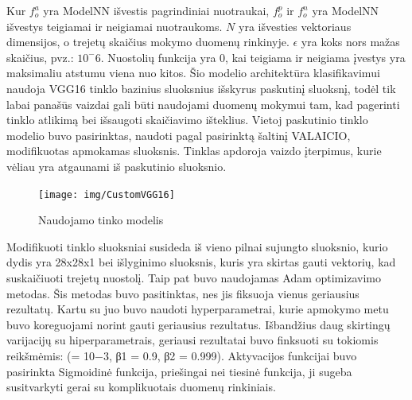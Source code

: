 \documentclass{VUMIFPSkursinis}
\DeclareRobustCommand{\[}{\begin{equation}}
\DeclareRobustCommand{\]}{\end{equation}}
\begin{document}
Kur $f_o^a$ yra ModelNN išvestis pagrindiniai nuotraukai, $f_o^p$ ir $f_o^n$ yra ModelNN išvestys teigiamai ir neigiamai nuotraukoms. $N$ yra išvesties vektoriaus dimensijos, o  trejetų skaičius mokymo duomenų rinkinyje. $\epsilon$ yra koks nors mažas skaičius, pvz.: $10^-6$. Nuostolių funkcija yra 0, kai teigiama ir neigiama įvestys yra maksimaliu atstumu viena nuo kitos.  
Šio modelio architektūra klasifikavimui naudoja VGG16 tinklo bazinius sluoksnius išskyrus paskutinį sluoksnį, todėl tik labai panašūs vaizdai gali būti naudojami duomenų mokymui tam, kad pagerinti tinklo atlikimą bei išsaugoti skaičiavimo išteklius. Vietoj paskutinio tinklo modelio buvo pasirinktas, naudoti pagal pasirinktą šaltinį VALAICIO, modifikuotas apmokamas sluoksnis.
Tinklas apdoroja vaizdo įterpimus, kurie vėliau yra atgaunami iš paskutinio sluoksnio.
\begin{figure}[H]
\centering
\texttt{[image: img/CustomVGG16]}
\caption{Naudojamo tinko modelis} %
\label{img:mlp}
\end{figure}

Modifikuoti tinklo sluoksniai susideda iš vieno pilnai sujungto sluoksnio, kurio dydis yra 28x28x1 bei išlyginimo sluoksnis, kuris yra skirtas gauti vektorių, kad suskaičiuoti trejetų nuostolį.
Taip pat buvo naudojamas Adam optimizavimo metodas. Šis metodas buvo pasitinktas, nes jis fiksuoja vienus geriausius rezultatų. Kartu su juo buvo naudoti hyperparametrai, kurie apmokymo metu buvo koreguojami norint gauti geriausius rezultatus. Išbandžius daug skirtingų varijacijų su hiperparametrais, geriausi rezultatai buvo finksuoti su tokiomis reikšmėmis:  (= 10−3, β1 = 0.9, β2 = 0.999). Aktyvacijos funkcijai buvo pasirinkta Sigmoidinė funkcija, priešingai nei tiesinė funkcija, ji sugeba susitvarkyti gerai su komplikuotais duomenų rinkiniais.
\end{document}
